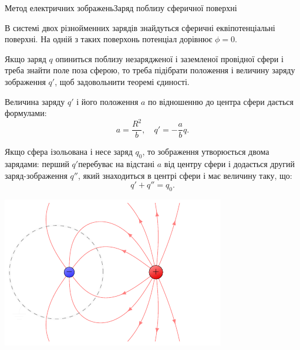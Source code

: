 \documentclass{beamer}
\begin{document}
\begin{frame}{Метод електричних зображень}{Заряд поблизу сферичної поверхні}
	\begin{overprint}
		\begin{block}{}\justifying
			В системі двох різнойменних зарядів знайдуться сферичні еквіпотенціальні поверхні. На
			одній з таких поверхонь потенціал дорівнює $\phi = 0$.
		\end{block}
		\begin{block}{}\justifying
			Якщо заряд $q$ опиниться поблизу \alert{незарядженої} і \alert{заземленої провідної сфери} і
			треба знайти поле поза сферою, то треба підібрати положення і величину заряду зображення $q'$,
			щоб задовольнити теоремі єдиності.
		\end{block}
		\begin{block}{}\justifying
			Величина заряду $q'$ і його положення $a$ по відношенню до центра сфери дається формулами:
			\begin{equation*}
				a = \frac{R^2}{b}, \quad   q' = -\frac{a}{b}q.
			\end{equation*}
		\end{block}
		\begin{block}{}\justifying
			Якщо сфера \alert{ізольована} і \alert{несе заряд $q_0$}, то зображення утворюється
			двома зарядами: перший $q' $перебуває на відстані $a$ від центру сфери і додається
			другий заряд-зображення $q''$, який знаходиться в центрі сфери і має величину таку, що:
			\begin{equation*}
				q' + q'' = q_0.
			\end{equation*}
		\end{block}
	\end{overprint}
	\begin{overprint}
		\onslide<1>
		\begin{center}
			\includegraphics[page=1]{mirrorsphere}

\end{center}
\end{overprint}
\end{frame}
\end{document}
